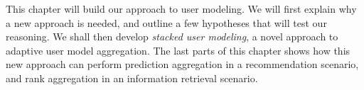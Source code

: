 This chapter will build our approach to user modeling.
We will first explain why a new approach is needed,
and outline a few hypotheses that will test our reasoning.
We shall then develop \emph{stacked user modeling},
a novel approach to adaptive user model aggregation.
The last parts of this chapter shows how this new approach
can perform prediction aggregation in a recommendation scenario,
and rank aggregation in an information retrieval scenario.







